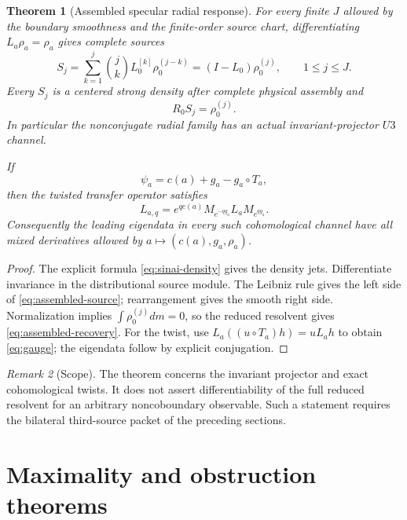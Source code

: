 \documentclass[11pt,reqno]{amsart}
\newtheorem{theorem}{Theorem}[section]
\theoremstyle{definition}
\theoremstyle{remark}
\newtheorem{remark}[theorem]{Remark}
\begin{document}
\begin{theorem}[Assembled specular radial response]\label{thm:sinai-u3}
For every finite $J$ allowed by the boundary smoothness and the finite-order
source chart, differentiating $L_a\rho_a=\rho_a$ gives complete sources
\begin{equation}\label{eq:assembled-source}
 S_j=\sum_{k=1}^j{j\choose k}L_0^{[k]}\rho_0^{(j-k)}
 =(I-L_0)\rho_0^{(j)},
 \qquad 1\le j\le J.
\end{equation}
Every $S_j$ is a centered strong density after complete physical assembly and
\begin{equation}\label{eq:assembled-recovery}
 R_0S_j=\rho_0^{(j)}.
\end{equation}
In particular the nonconjugate radial family has an actual invariant-projector
$U3$ channel.

If
\[
 \psi_a=c(a)+g_a-g_a\circ T_a,
\]
then the twisted transfer operator satisfies
\begin{equation}\label{eq:gauge}
 L_{a,q}=e^{qc(a)}M_{e^{-qg_a}}L_aM_{e^{qg_a}}.
\end{equation}
Consequently the leading eigendata in every such cohomological channel have all
mixed derivatives allowed by $a\mapsto(c(a),g_a,\rho_a)$.
\end{theorem}

\begin{proof}
The explicit formula \eqref{eq:sinai-density} gives the density jets.
Differentiate invariance in the distributional source module.  The Leibniz
rule gives the left side of \eqref{eq:assembled-source}; rearrangement gives
the smooth right side.  Normalization implies
$\int\rho_0^{(j)}dm=0$, so the reduced resolvent gives
\eqref{eq:assembled-recovery}.  For the twist, use
$L_a((u\circ T_a)h)=uL_ah$ to obtain \eqref{eq:gauge}; the eigendata follow by
explicit conjugation.
\end{proof}

\begin{remark}[Scope]
The theorem concerns the invariant projector and exact cohomological twists.
It does not assert differentiability of the full reduced resolvent for an
arbitrary noncoboundary observable.  Such a statement requires the bilateral
third-source packet of the preceding sections.
\end{remark}

\section{Maximality and obstruction theorems}\label{sec:maximality}
\end{document}
